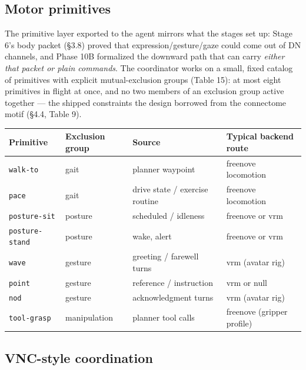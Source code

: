 \documentclass[11pt]{article}
\begin{document}
\subsection{Motor primitives}

The primitive layer exported to the agent mirrors what the stages set up: Stage 6's body packet (§3.8) proved that expression/gesture/gaze could come out of DN channels, and Phase 10B formalized the downward path that can carry \emph{either that packet or plain commands}. The coordinator works on a small, fixed catalog of primitives with explicit mutual-exclusion groups (Table 15): at most eight primitives in flight at once, and no two members of an exclusion group active together — the shipped constraints the design borrowed from the connectome motif (§4.4, Table 9).

{\small
{}
\begin{longtable}{@{}>{\raggedright\arraybackslash}p{} >{\raggedright\arraybackslash}p{} >{\raggedright\arraybackslash}p{} >{\raggedright\arraybackslash}p{}@{}}
\toprule
\textbf{Primitive} & \textbf{Exclusion group} & \textbf{Source} & \textbf{Typical backend route} \\
\midrule
\texttt{walk-to} & gait & planner waypoint & freenove locomotion \\
\texttt{pace} & gait & drive state / exercise routine & freenove locomotion \\
\texttt{posture-sit} & posture & scheduled / idleness & freenove or vrm \\
\texttt{posture-stand} & posture & wake, alert & freenove or vrm \\
\texttt{wave} & gesture & greeting / farewell turns & vrm (avatar rig) \\
\texttt{point} & gesture & reference / instruction & vrm or null \\
\texttt{nod} & gesture & acknowledgment turns & vrm (avatar rig) \\
\texttt{tool-grasp} & manipulation & planner tool calls & freenove (gripper profile) \\
\bottomrule
\end{longtable}
}

\subsection{VNC-style coordination}
\end{document}
